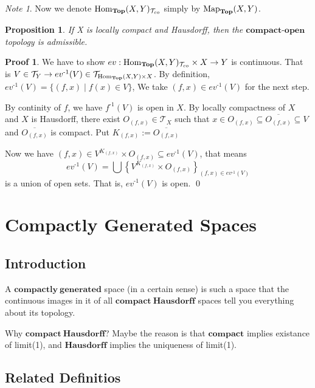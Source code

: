 \documentclass[a4paper]{article}
\theoremstyle{plain}
\newtheorem{prop}[thm]{Proposition}
\theoremstyle{definition}
\newtheorem*{prf}{Proof}
\theoremstyle{remark}
\newtheorem*{note}{Note}
\newcommand{\setsubsectcounter}[1]{\setcounter{subsection}{#1}}
\newcommand{\mc}[1]{\mathcal{#1}}
\newcommand{\mbf}[1]{\mathbf{#1}}
\newcommand{\mcT}{\mc T}
\newcommand{\ol}[1]{\overline{#1}}
\newcommand{\inv}[1]{#1^{\text{-}1}}
\DeclareMathOperator{\Homtop}{\rm{Hom}_{\mbf{Top}}}
\DeclareMathOperator{\Maptop}{\rm{Map}_{\mbf{Top}}}
\begin{document}
    \begin{note}
        Now we denote $\Homtop(X,Y)_{\mcT_{co}}$ simply by $\Maptop(X,Y)$.
    \end{note}

    \begin{prop}
        If X is locally compact and Hausdorff, then the $\mbf{compact\text{-}open}$
        topology is admissible.
    \end{prop}
    \begin{prf}
        We have to show $ev : \Homtop(X,Y)_{\mcT_{co}} \times X \to Y$ is continuous.
        That is $V \in \mcT_Y \to \inv{ev}(V) \in \mcT_{\Homtop(X,Y) \times X }$.
        By definition, $\inv{ev}(V) = \{ (f,x) \mid f(x) \in V \}$,
        We take $(f,x) \in \inv{ev}(V)$ for the next step.
        \par  By continity of $f$, we have $\inv{f} (V)$ is open in $X$.
        By locally compactness of $X$ and $X$ is Hausdorff, there exist
        $ O_{(f,x)} \in \mcT_X$ such that $x \in O_{(f,x)} \subseteq \ol{O_{(f,x)}} \subseteq V$
        and $\ol{O_{(f,x)}}$ is compact. Put $K_{(f,x)} := \ol{O_{(f,x)}}$
        \par Now we have $(f,x) \in V^{K_{(f,x)}} \times O_{(f,x)} \subseteq \inv{ev}(V)$, that means
        $$ \inv{ev}(V) = \bigcup \left\{ V^{K_{(f,x)}} \times O_{(f,x)} \right\}_{(f,x) \in \inv{ev}(V)} $$ 
        is a union of open sets. That is, $\inv{ev}(V)$ is open.
        \qed
    \end{prf}

    
    \section{Compactly Generated Spaces}

    \setsubsectcounter{-1}

    \subsection{Introduction}

    A $\mbf{compactly\ generated}$ space (in a certain sense) is such a space that the continuous images in it of
    all $\mbf{compact\ Hausdorff}$ spaces tell you everything about its topology.
    \par Why $\mbf{compact\ Hausdorff}$? Maybe the reason is that $\mbf{compact}$ implies existance of limit(1),
    and $\mbf{Hausdorff}$ implies the uniqueness of limit(1).  

    \subsection{Related Definitios}
\end{document}
